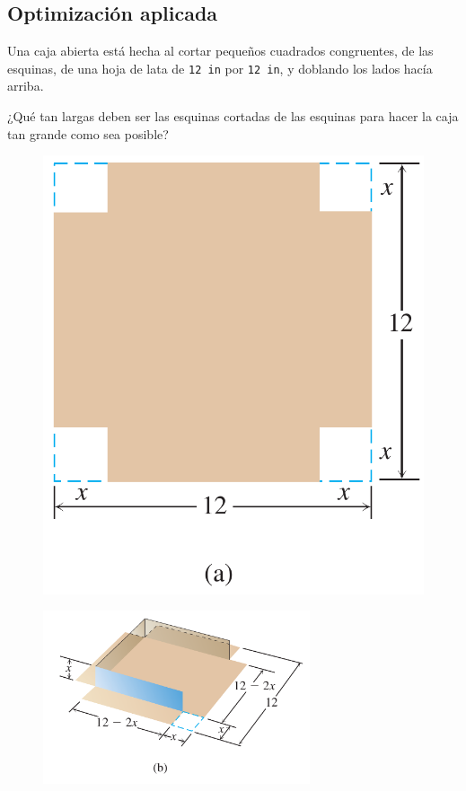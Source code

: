 \subsection{Optimización aplicada}


	\begin{problema}
		Una caja abierta está hecha al cortar pequeños cuadrados congruentes, de las esquinas, de una hoja de lata de \texttt{12 in} por \texttt{12 in}, y doblando los lados hacía arriba. 
		
		¿Qué tan largas deben ser las esquinas cortadas de las esquinas para hacer la caja tan grande como sea posible?
	\end{problema}



	\begin{figure}
		\centering
		\includegraphics[height=0.7\textheight]{./calculo/thomas_04_36_a}
		\label{fig:thomas0436a}
	\end{figure}
	



	\begin{figure}
		\centering
		\includegraphics[width=0.7\textwidth]{./calculo/thomas_04_36_b}
		\label{fig:thomas0436b}
	\end{figure}
	



